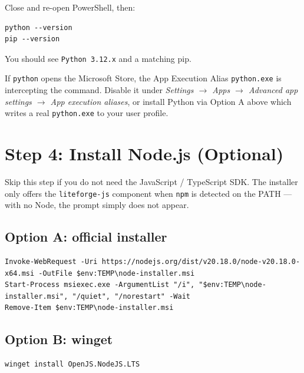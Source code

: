 \documentclass[11pt,letterpaper]{article}
\begin{document}
Close and re-open PowerShell, then:

\begin{lstlisting}[style=powershell]
python --version
pip --version
\end{lstlisting}

You should see \texttt{Python 3.12.x} and a matching pip.

\begin{tcolorbox}[warnbox={Microsoft Store stub}]
If \texttt{python} opens the Microsoft Store, the App Execution Alias
\texttt{python.exe} is intercepting the command. Disable it under
\textit{Settings $\to$ Apps $\to$ Advanced app settings $\to$ App
execution aliases}, or install Python via Option A above which writes a
real \texttt{python.exe} to your user profile.
\end{tcolorbox}

\newpage
\section{Step 4: Install Node.js (Optional)}

Skip this step if you do not need the JavaScript / TypeScript SDK. The
installer only offers the \texttt{liteforge-js} component when \texttt{npm}
is detected on the PATH --- with no Node, the prompt simply does not
appear.

\subsection{Option A: official installer}

\begin{lstlisting}[style=powershell]
Invoke-WebRequest -Uri https://nodejs.org/dist/v20.18.0/node-v20.18.0-x64.msi -OutFile $env:TEMP\node-installer.msi
Start-Process msiexec.exe -ArgumentList "/i", "$env:TEMP\node-installer.msi", "/quiet", "/norestart" -Wait
Remove-Item $env:TEMP\node-installer.msi
\end{lstlisting}

\subsection{Option B: winget}

\begin{lstlisting}[style=powershell]
winget install OpenJS.NodeJS.LTS
\end{lstlisting}
\end{document}
